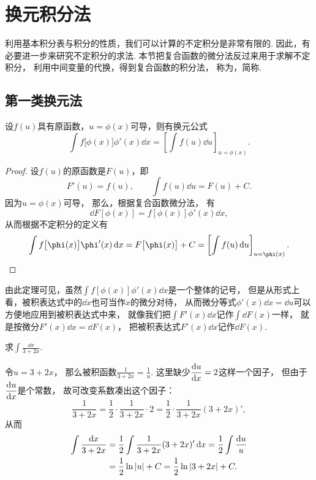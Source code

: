 \section{换元积分法}
利用基本积分表与积分的性质，我们可以计算的不定积分是非常有限的.
因此，有必要进一步来研究不定积分的求法.
本节把复合函数的微分法反过来用于求解不定积分，
利用中间变量的代换，得到复合函数的积分法，
称为，简称.

\subsection{第一类换元法}
\begin{theorem}
设\(f(u)\)具有原函数，\(u=\phi(x)\)可导，则有换元公式\begin{equation*}
	\int f\bigl[\phi(x)\bigr] \phi'(x) \dd{x}
	= \left[ \int f(u) \dd{u} \right]_{u=\phi(x)}.
\end{equation*}
\begin{proof}
设\(f(u)\)的原函数是\(F(u)\)，即\begin{equation*}
	F'(u) = f(u),
	\qquad
	\int f(u) \dd{u} = F(u) + C.
\end{equation*}
因为\(u = \phi(x)\)可导，
那么，根据复合函数微分法，
有\begin{equation*}
	\dd{F\left[\phi(x)\right]} = f\left[\phi(x)\right] \phi'(x) \dd{x},
\end{equation*}
从而根据不定积分的定义有\begin{equation*}
	\int f\bigl[\phi(x)\bigr] \phi'(x) \dd{x}
	= F\bigl[\phi(x)\bigr] + C
	= \left[ \int f(u) \dd{u} \right]_{u=\phi(x)}.
	\qedhere
\end{equation*}
\end{proof}
\end{theorem}

由此定理可见，虽然\(\int f[\phi(x)] \phi'(x) \dd{x}\)是一个整体的记号，
但是从形式上看，被积表达式中的\(\dd{x}\)也可当作\(x\)的微分对待，
从而微分等式\(\phi'(x) \dd{x} = \dd{u}\)可以方便地应用到被积表达式中来，
就像我们把\(\int F'(x) \dd{x}\)记作\(\int \dd{F(x)}\)一样，
就是按微分\(F'(x) \dd{x} = \dd{F(x)}\)，
把被积表达式\(F'(x) \dd{x}\)记作\(\dd{F(x)}\).

\begin{example}
求\(\int \frac{\dd{x}}{3+2x}\).
\begin{solution}
令\(u = 3+2x\)，
那么被积函数\(\frac{1}{3+2x} = \frac{1}{u}\).
这里缺少\(\displaystyle\dv{u}{x}=2\)这样一个因子，
但由于\(\displaystyle\dv{u}{x}\)是个常数，
故可改变系数凑出这个因子：\begin{equation*}
	\frac{1}{3+2x}
	= \frac{1}{2} \cdot \frac{1}{3+2x} \cdot 2
	= \frac{1}{2} \cdot \frac{1}{3+2x} (3+2x)',
\end{equation*}
从而\begin{align*}
	\int \frac{\dd{x}}{3+2x}
	&= \frac{1}{2} \int \frac{1}{3+2x} (3+2x)' \dd{x}
	= \frac{1}{2} \int \frac{\dd{u}}{u} \\
	&= \frac{1}{2} \ln\abs{u} + C
	= \frac{1}{2} \ln\abs{3+2x} + C.
\end{align*}
\end{solution}
\end{example}

